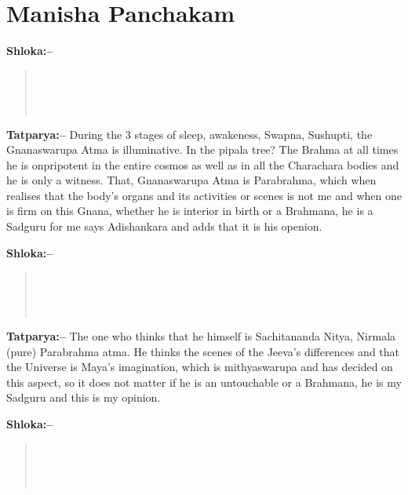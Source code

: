 \chapter{Manisha Panchakam}

\textbf{Shloka:–}

\begin{verse}
 \\\\\\ 
\end{verse}

\textbf{Tatparya:–} During the 3 stages of sleep, awakeness, Swapna, Sushupti, the Gnanaswarupa Atma is illuminative. In the pipala tree? The Brahma at all times he is onpripotent in the entire cosmos as well as in all the Charachara bodies and he is only a witness. That, Gnanaswarupa Atma is Parabrahma, which when realises that the body's organs and its activities or scenes is not me and when one is firm on this Gnana, whether he is interior in birth or a Brahmana, he is a Sadguru for me says Adishankara and adds that it is his openion.

\textbf{Shloka:–}

\begin{verse}
 \\\\\\ 
\end{verse}

\textbf{Tatparya:–} The one who thinks that he himself is Sachitananda Nitya, Nirmala (pure) Parabrahma atma. He thinks the scenes of the Jeeva's differences and that the Universe is Maya's imagination, which is mithyaswarupa and has decided on this aspect, so it does not matter if he is an untouchable or a Brahmana, he is my Sadguru and this is my opinion.

\textbf{Shloka:–}

\begin{verse}
 \\\\\\ 
\end{verse}

